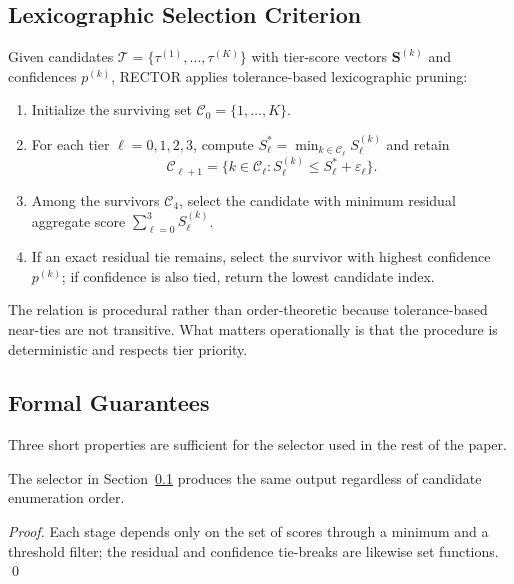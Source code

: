 \subsection{Lexicographic Selection Criterion}
\label{subsec:lexicographic_selection}

Given candidates $\mathcal{T}=\{\tau^{(1)},\ldots,\tau^{(K)}\}$ with tier-score vectors $\mathbf{S}^{(k)}$ and confidences $p^{(k)}$, RECTOR applies tolerance-based lexicographic pruning:
\begin{definition}
\label{def:lex_selection}
\begin{enumerate}
\item Initialize the surviving set $\mathcal{C}_0 = \{1,\ldots,K\}$.
\item For each tier $\ell = 0,1,2,3$, compute $S_\ell^* = \min_{k \in \mathcal{C}_\ell} S_\ell^{(k)}$ and retain
\[
\mathcal{C}_{\ell+1} = \{k \in \mathcal{C}_\ell : S_\ell^{(k)} \le S_\ell^* + \varepsilon_\ell\}.
\]
\item Among the survivors $\mathcal{C}_4$, select the candidate with minimum residual aggregate score $\sum_{\ell=0}^{3} S_\ell^{(k)}$.
\item If an exact residual tie remains, select the survivor with highest confidence $p^{(k)}$; if confidence is also tied, return the lowest candidate index.
\end{enumerate}
\end{definition}

The relation is procedural rather than order-theoretic because tolerance-based near-ties are not transitive. What matters operationally is that the procedure is deterministic and respects tier priority.

\subsection{Formal Guarantees}
\label{subsec:formal_guarantees}

Three short properties are sufficient for the selector used in the rest of the paper.

\begin{proposition}
\label{thm:order_invariance}
The selector in Section~\ref{subsec:lexicographic_selection} produces the same output regardless of candidate enumeration order.
\end{proposition}
\begin{proof}
Each stage depends only on the set of scores through a minimum and a threshold filter; the residual and confidence tie-breaks are likewise set functions. \qed
\end{proof}

